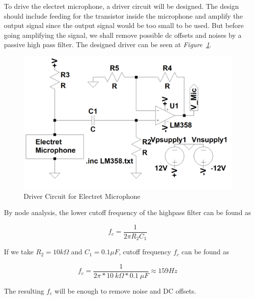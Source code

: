 \documentclass[paper]{IEEEtran}
\begin{document}
	To drive the electret microphone, a driver circuit will be designed. The design should include feeding for the transistor inside the microphone and amplify the output signal since the output signal would be too small to be used. But before going amplifying the signal, we shall remove possible dc offsets and noises by a passive high pass filter. The designed driver can be seen at \textit{Figure~\ref{fig:micdr}}.

\begin{figure}[h!]
\setlength{\unitlength}{\textwidth}
\center 
\includegraphics[width=0.45\unitlength]{micv2.png}
\caption{\label{fig:micdr}Driver Circuit for Electret Microphone }
\end{figure}	


By node analysis, the lower cutoff frequency of the highpass filter can be found as

$$ f_{c} =\frac{1}{2\pi R_{2}C_{1}} $$

If we take $R_{2}=10k\Omega$ and $C_{1}=0.1\mu F$, cutoff frequency $f_c$ can be found as

$$ f_{c} =\frac{1}{2\pi*10~k\Omega*0.1~\mu F}\approx 159 Hz $$

The resulting $f_c$ will be enough to remove noise and DC offsets.

\end{document}
